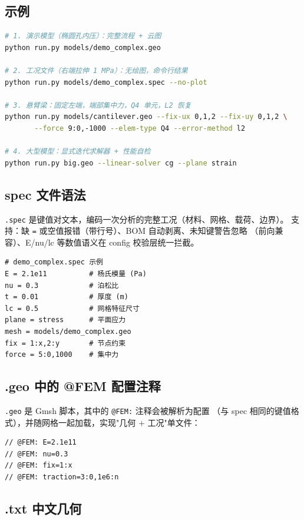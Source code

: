 \documentclass[12pt,a4paper]{ctexart}
\newcommand{\fem}{\Verb}
\begin{document}
\subsection{示例}

\begin{lstlisting}[language=bash]
# 1. 演示模型（椭圆孔内压）：完整流程 + 云图
python run.py models/demo_complex.geo

# 2. 工况文件（右端拉伸 1 MPa）：无绘图，命令行结果
python run.py models/demo_complex.spec --no-plot

# 3. 悬臂梁：固定左端，端部集中力，Q4 单元，L2 恢复
python run.py models/cantilever.geo --fix-ux 0,1,2 --fix-uy 0,1,2 \
       --force 9:0,-1000 --elem-type Q4 --error-method l2

# 4. 大型模型：显式迭代求解器 + 性能自检
python run.py big.geo --linear-solver cg --plane strain
\end{lstlisting}

\subsection{spec 文件语法}

\fem|.spec| 是键值对文本，编码一次分析的完整工况（材料、网格、载荷、边界）。
支持：缺 \fem|=| 或空值报错（带行号）、BOM 自动剥离、未知键警告忽略
（前向兼容）、E/nu/lc 等数值语义在 config 校验层统一拦截。

\begin{lstlisting}
# demo_complex.spec 示例
E = 2.1e11          # 杨氏模量 (Pa)
nu = 0.3            # 泊松比
t = 0.01            # 厚度 (m)
lc = 0.5            # 网格特征尺寸
plane = stress      # 平面应力
mesh = models/demo_complex.geo
fix = 1:x,2:y       # 节点约束
force = 5:0,1000    # 集中力
\end{lstlisting}

\subsection{.geo 中的 @FEM 配置注释}

\fem|.geo| 是 Gmsh 脚本，其中的 \fem|@FEM:| 注释会被解析为配置
（与 spec 相同的键值格式），并随网格一起加载，实现"几何 + 工况"单文件：

\begin{lstlisting}
// @FEM: E=2.1e11
// @FEM: nu=0.3
// @FEM: fix=1:x
// @FEM: traction=3:0,1e6:n
\end{lstlisting}

\subsection{.txt 中文几何}
\end{document}
